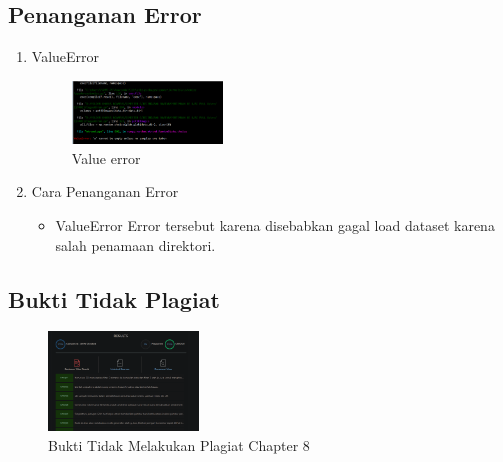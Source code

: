 \subsection{Penanganan Error}
\begin{enumerate}
    \item ValueError
    \begin{figure}[H]
		\includegraphics[width=4cm]{figures/1164013/err/8_value.png}
		\centering
		\caption{Value error}
    \end{figure}
    \item Cara Penanganan Error
    \begin{itemize}
        \item ValueError
        \hfill\break
		Error tersebut karena disebabkan gagal load dataset karena salah penamaan direktori.
    \end{itemize}
\end{enumerate}
\subsection{Bukti Tidak Plagiat}
\begin{figure}[H]
    \includegraphics[width=4cm]{figures/1164013/ve/8.png}
    \centering
    \caption{Bukti Tidak Melakukan Plagiat Chapter 8}
\end{figure}